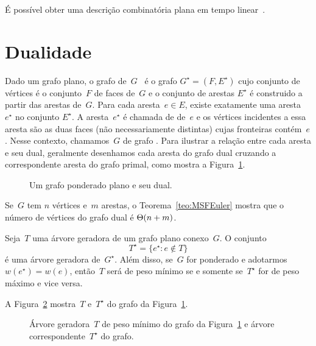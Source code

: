 É possível obter uma descrição combinatória plana em tempo linear~.

\section{Dualidade}
\label{sec:dualidade}


Dado um grafo plano, o grafo  de~$G$~\cite{planarTheoryAlgorith} é o grafo $G^\star = (F,E^\star)$ cujo conjunto de vértices é o conjunto~$F$ de faces de~$G$ e o conjunto de arestas $E^\star$ é construido a partir das arestas de~$G$.
Para cada aresta~$e\in E$, existe exatamente uma aresta~$e^\star$ no conjunto $E^\star$.
A aresta~$e^\star$ é chamada de  de~$e$ e os vértices incidentes a essa aresta são as duas faces (não necessariamente distintas) cujas fronteiras contém~$e$.
Nesse contexto, chamamos~$G$ de grafo .
Para ilustrar a relação entre cada aresta e seu dual, geralmente desenhamos cada aresta do grafo dual cruzando a correspondente aresta do grafo primal, como mostra a Figura~\ref{fig:MSF-basico-1}.

\begin{figure}[htb]
\scalebox{1.5}{
\centering

}
\caption{Um grafo ponderado plano e seu dual.}
\label{fig:MSF-basico-1}
\end{figure}


Se~$G$ tem $n$ vértices e~$m$ arestas, o Teorema~\ref{teo:MSFEuler} mostra que o número de vértices do grafo dual é $\Theta(n+m)$.

\begin{theorem}
\label{teo:MSFdual}
Seja~$T$ uma árvore geradora de um grafo plano conexo~$G$. O conjunto
$$
T^\star = \{e^\star:e\notin T\}
$$
é uma árvore geradora de~$G^\star$.
Além disso, se~$G$ for ponderado e adotarmos $w(e^\star) = w(e)$, então~$T$ será de peso mínimo se e somente se~$T^\star$ for de peso máximo e vice versa.
\end{theorem}

A Figura~\ref{fig:MSF-figura-2} mostra~$T$ e~$T^\star$ do grafo da Figura~\ref{fig:MSF-basico-1}.


\begin{figure}[htb]
\scalebox{1.5}{
\centering

}
\caption{Árvore geradora~$T$ de peso mínimo do grafo da Figura~\ref{fig:MSF-basico-1} e árvore correspondente~$T^\star$ do grafo.}
\label{fig:MSF-figura-2}
\end{figure}



